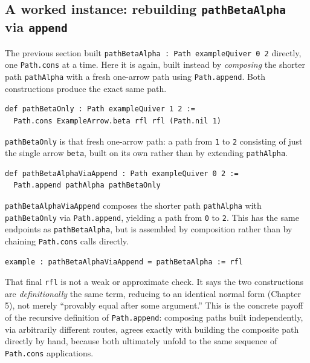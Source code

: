 \subsection{\texorpdfstring{A worked instance: rebuilding \texttt{pathBetaAlpha} via \texttt{append}}{A worked instance: rebuilding pathBetaAlpha via append}}\label{sec:11-path-algebras:05-path-composition:2}

The previous section built \texttt{pathBetaAlpha : Path exampleQuiver 0 2} directly, one \texttt{Path.cons} at a time. Here it is again, built instead by \emph{composing} the shorter path \texttt{pathAlpha} with a fresh one-arrow path using \texttt{Path.append}. Both constructions produce the exact same path.

\begin{lstlisting}
def pathBetaOnly : Path exampleQuiver 1 2 :=
  Path.cons ExampleArrow.beta rfl rfl (Path.nil 1)
\end{lstlisting}

\texttt{pathBetaOnly} is that fresh one-arrow path: a path from \texttt{1} to \texttt{2} consisting of just the single arrow \texttt{beta}, built on its own rather than by extending \texttt{pathAlpha}.

\begin{lstlisting}
def pathBetaAlphaViaAppend : Path exampleQuiver 0 2 :=
  Path.append pathAlpha pathBetaOnly
\end{lstlisting}

\texttt{pathBetaAlphaViaAppend} composes the shorter path \texttt{pathAlpha} with \texttt{pathBetaOnly} via \texttt{Path.append}, yielding a path from \texttt{0} to \texttt{2}. This has the same endpoints as \texttt{pathBetaAlpha}, but is assembled by composition rather than by chaining \texttt{Path.cons} calls directly.

\begin{lstlisting}
example : pathBetaAlphaViaAppend = pathBetaAlpha := rfl
\end{lstlisting}

That final \texttt{rfl} is not a weak or approximate check. It says the two constructions are \emph{definitionally} the same term, reducing to an identical normal form (Chapter 5), not merely ``provably equal after some argument.'' This is the concrete payoff of the recursive definition of \texttt{Path.append}: composing paths built independently, via arbitrarily different routes, agrees exactly with building the composite path directly by hand, because both ultimately unfold to the same sequence of \texttt{Path.cons} applications.

